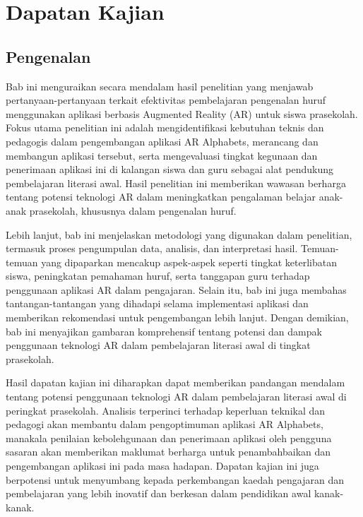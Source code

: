 \chapter{Dapatan Kajian}
\section{Pengenalan}

Bab ini menguraikan secara mendalam hasil penelitian yang menjawab pertanyaan-pertanyaan terkait efektivitas pembelajaran pengenalan huruf menggunakan aplikasi berbasis Augmented Reality (AR) untuk siswa prasekolah. Fokus utama penelitian ini adalah mengidentifikasi kebutuhan teknis dan pedagogis dalam pengembangan aplikasi AR Alphabets, merancang dan membangun aplikasi tersebut, serta mengevaluasi tingkat kegunaan dan penerimaan aplikasi ini di kalangan siswa dan guru sebagai alat pendukung pembelajaran literasi awal. Hasil penelitian ini memberikan wawasan berharga tentang potensi teknologi AR dalam meningkatkan pengalaman belajar anak-anak prasekolah, khususnya dalam pengenalan huruf.

Lebih lanjut, bab ini menjelaskan metodologi yang digunakan dalam penelitian, termasuk proses pengumpulan data, analisis, dan interpretasi hasil. Temuan-temuan yang dipaparkan mencakup aspek-aspek seperti tingkat keterlibatan siswa, peningkatan pemahaman huruf, serta tanggapan guru terhadap penggunaan aplikasi AR dalam pengajaran. Selain itu, bab ini juga membahas tantangan-tantangan yang dihadapi selama implementasi aplikasi dan memberikan rekomendasi untuk pengembangan lebih lanjut. Dengan demikian, bab ini menyajikan gambaran komprehensif tentang potensi dan dampak penggunaan teknologi AR dalam pembelajaran literasi awal di tingkat prasekolah.


\hspace{1cm}{}Hasil dapatan kajian ini diharapkan dapat memberikan pandangan mendalam tentang potensi penggunaan teknologi AR dalam pembelajaran literasi awal di peringkat prasekolah. Analisis terperinci terhadap keperluan teknikal dan pedagogi akan membantu dalam pengoptimuman aplikasi AR Alphabets, manakala penilaian kebolehgunaan dan penerimaan aplikasi oleh pengguna sasaran akan memberikan maklumat berharga untuk penambahbaikan dan pengembangan aplikasi ini pada masa hadapan. Dapatan kajian ini juga berpotensi untuk menyumbang kepada perkembangan kaedah pengajaran dan pembelajaran yang lebih inovatif dan berkesan dalam pendidikan awal kanak-kanak.\\


